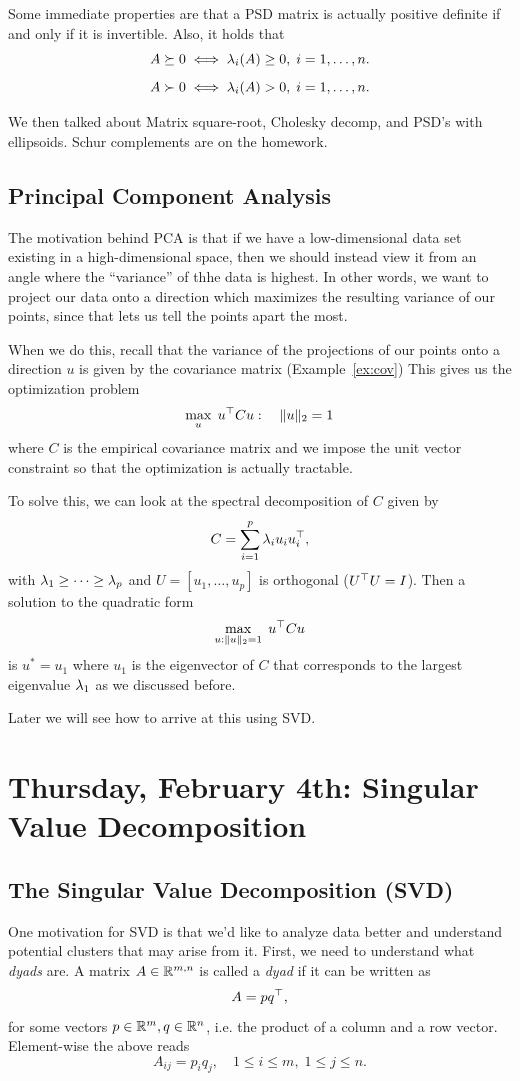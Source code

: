 \documentclass[11 pt]{scrartcl}
\begin{document}
Some immediate properties are that a PSD matrix is actually positive definite if and only if it is invertible. 
Also, it holds that 
\[ A \succeq 0 \iff \lambda_i(A) \geq 0,\; i=1, \dots, n.\] 
\[ A \succ   0 \iff \lambda_i(A) > 0,\; i=1, \dots, n.\] 

We then talked about Matrix square-root, Cholesky decomp, and PSD's with ellipsoids. 
Schur complements are on the homework.

\subsection{Principal Component Analysis}

The motivation behind PCA is that if we have a low-dimensional data set existing in a high-dimensional space, then we should instead view it from an angle where the ``variance'' of thhe data is highest. 
In other words, we want to project our data onto a direction which maximizes the resulting variance of our points, since that lets us tell the points apart the most. 

When we do this, recall that the variance of the projections of our points onto a direction $u$ is given by the covariance matrix (Example~\ref{ex:cov})
This gives us the optimization problem 
\[ \max_u\; u^\top C u: \quad \|u\|_2 = 1\] 
where $C$ is the empirical covariance matrix and we impose the unit vector constraint so that the optimization is actually tractable. 

To solve this, we can look at the spectral decomposition of $C$ given by 
\[ C = \sum_{i=1}^p \lambda_i u_i u_i^\top,\] 
with $\lambda_1 \geq \dots \geq \lambda_p$ and $U = [u_1,\dots, u_p]$ is orthogonal ($U^\top U = I$). Then a solution to the quadratic form 
\[ \max_{u: \|u\|_2=1} \; u^\top C u\] 
is $u^* = u_1$ where $u_1$ is the eigenvector of $C$ that corresponds to the largest eigenvalue $\lambda_1$ as we discussed before. 

Later we will see how to arrive at this using SVD. 


\newpage
\section{Thursday, February 4th: Singular Value Decomposition}

\subsection{The Singular Value Decomposition (SVD)}
One motivation for SVD is that we'd like to analyze data better and understand potential clusters that may arise from it. 
First, we need to understand what \emph{dyads} are. 
A matrix $A\in \mathbb R^{m,n}$ is called a \emph{dyad} if it can be written as 
\[ A = pq^\top,\] 
for some vectors $p\in \mathbb R^m, q\in \mathbb R^n$, i.e. the product of a column and a row vector.
Element-wise the above reads 
\[ A_{ij} = p_iq_j, \quad 1\leq i\leq m,\; 1\leq j \leq n.\] 
\end{document}
